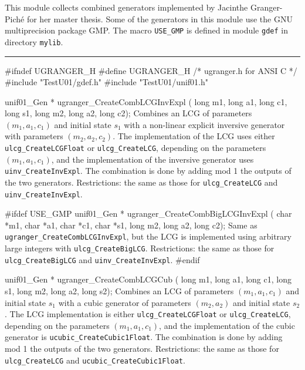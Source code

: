 
This module collects combined generators implemented by
Jacinthe Granger-Pich\'e for her master thesis. 
Some of the generators in this module use the GNU multiprecision package GMP. 
The macro {\tt USE\_GMP} is defined in module {\tt gdef} in directory
{\tt mylib}. %


\bigskip
\hrule
\code\hide
#ifndef UGRANGER_H
#define UGRANGER_H
/* ugranger.h for ANSI C */
\endhide
#include "TestU01/gdef.h"
#include "TestU01/unif01.h"


unif01_Gen * ugranger_CreateCombLCGInvExpl (
   long m1, long a1, long c1, long s1, long m2, long a2, long c2);
\endcode
 \tab
   Combines an  LCG of parameters $(m_1, a_1, c_1)$ and initial
   state $s_1$ with a non-linear explicit  inversive  generator  
   with parameters $(m_2, a_2, c_2)$. The implementation of the LCG uses either
   {\tt ulcg\_CreateLCGFloat} or {\tt ulcg\_CreateLCG},
   depending on the parameters
   $(m_1, a_1, c_1)$, and the implementation of the inversive generator uses 
   {\tt uinv\_CreateInvExpl}. The combination is done by adding mod 1 the
   outputs of the two generators.
   Restrictions: the same as those for {\tt ulcg\_CreateLCG} and
   {\tt uinv\_CreateInvExpl}.
 \endtab
\code


#ifdef USE_GMP
   unif01_Gen * ugranger_CreateCombBigLCGInvExpl (
      char *m1, char *a1, char *c1, char *s1, long m2, long a2, long c2);
\endcode
 \tab 
   Same as {\tt ugranger\_CreateCombLCGInvExpl}, but the LCG is implemented 
   using arbitrary large integers with {\tt ulcg\_CreateBigLCG}.  
   Restrictions: the same as those for {\tt ulcg\_CreateBigLCG} and
   {\tt uinv\_CreateInvExpl}.  
 \endtab
\code
#endif


unif01_Gen * ugranger_CreateCombLCGCub (
   long m1, long a1, long c1, long s1, long m2, long a2, long s2);
\endcode
 \tab Combines an LCG of parameters $(m_1, a_1, c_1)$ and initial
   state $s_1$ with a  cubic generator of parameters $(m_2, a_2)$ and
   initial state $s_2$. The  LCG implementation is either
   {\tt ulcg\_CreateLCGFloat} or {\tt ulcg\_CreateLCG}, depending on the
   parameters $(m_1, a_1, c_1)$, and the implementation of the
   cubic generator is {\tt ucubic\_CreateCubic1Float}.
   The combination is done by adding mod 1 the outputs of the two generators.
   Restrictions: the same as those for {\tt ulcg\_CreateLCG} and
   {\tt ucubic\_CreateCubic1Float}.
 \endtab
\code


